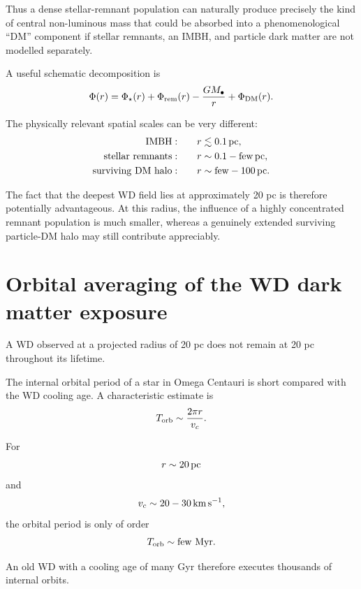 \documentclass[11pt,a4paper]{article}
\begin{document}
Thus a dense stellar-remnant population can naturally produce precisely the kind of central non-luminous mass that could be absorbed into a phenomenological ``DM'' component if stellar remnants, an IMBH, and particle dark matter are not modelled separately.

A useful schematic decomposition is
\begin{equation}
\Phi(r)
=
\Phi_\star(r)
+
\Phi_{\rm rem}(r)
-
\frac{GM_\bullet}{r}
+
\Phi_{\rm DM}(r).
\end{equation}

The physically relevant spatial scales can be very different:
\begin{align}
{\rm IMBH}: &\qquad r\lesssim0.1\,{\rm pc},
\\
{\rm stellar\ remnants}: &\qquad
r\sim0.1-\mathrm{few}\,{\rm pc},
\\
{\rm surviving\ DM\ halo}: &\qquad
r\sim\mathrm{few}-100\,{\rm pc}.
\end{align}

The fact that the deepest WD field lies at approximately 20 pc is therefore potentially advantageous. At this radius, the influence of a highly concentrated remnant population is much smaller, whereas a genuinely extended surviving particle-DM halo may still contribute appreciably.


\section{Orbital averaging of the WD dark matter exposure}

A WD observed at a projected radius of 20 pc does not remain at 20 pc throughout its lifetime.

The internal orbital period of a star in Omega Centauri is short compared with the WD cooling age. A characteristic estimate is
\begin{equation}
T_{\rm orb}
\sim
\frac{2\pi r}{v_c}.
\end{equation}

For
\begin{equation}
r\sim20\,{\rm pc}
\end{equation}
and
\begin{equation}
v_c\sim20-30\,{\rm km\,s^{-1}},
\end{equation}
the orbital period is only of order
\begin{equation}
T_{\rm orb}\sim\mathrm{few}\ {\rm Myr}.
\end{equation}

An old WD with a cooling age of many Gyr therefore executes thousands of internal orbits.
\end{document}
